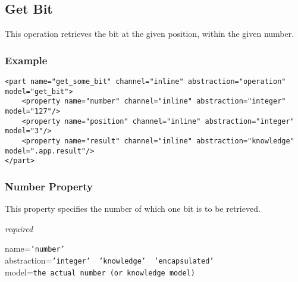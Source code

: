 %
%
%
%
%
%

\subsection{Get Bit}
\label{get_bit_heading}

This operation retrieves the bit at the given position, within the given number.

\subsubsection{Example}

\begin{scriptsize}
    \begin{verbatim}
<part name="get_some_bit" channel="inline" abstraction="operation" model="get_bit">
    <property name="number" channel="inline" abstraction="integer" model="127"/>
    <property name="position" channel="inline" abstraction="integer" model="3"/>
    <property name="result" channel="inline" abstraction="knowledge" model=".app.result"/>
</part>
    \end{verbatim}
\end{scriptsize}

\subsubsection{Number Property}

This property specifies the number of which one bit is to be retrieved.

\emph{required}

name=\texttt{'number'}\\
abstraction=\texttt{'integer' \vline\ 'knowledge' \vline\ 'encapsulated'}\\
model=\texttt{the actual number (or knowledge model)}

